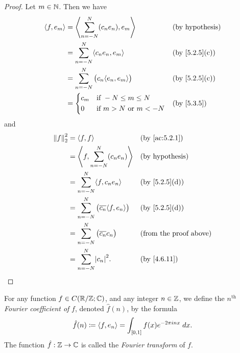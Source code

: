 \begin{proof}
  Let \(m \in \N\).
  Then we have
  \begin{align*}
    \inner*{f, e_m} & = \inner*{\sum_{n = -N}^N (c_n e_n), e_m}         &  & \text{(by hypothesis)}      \\
                    & = \sum_{n = -N}^N \inner*{c_n e_n, e_m}           &  & \text{(by \cref{5.2.5}(c))} \\
                    & = \sum_{n = -N}^N \big(c_n \inner*{e_n, e_m}\big) &  & \text{(by \cref{5.2.5}(c))} \\
                    & = \begin{dcases}
                          c_m & \text{if } -N \leq m \leq N         \\
                          0   & \text{if } m > N \text{ or } m < -N
                        \end{dcases}      &  & \text{(by \cref{5.3.5})}
  \end{align*}
  and
  \begin{align*}
    \norm*{f}_2^2 & = \inner*{f, f}                                            &  & \text{(by \cref{ac:5.2.1})}   \\
                  & = \inner*{f, \sum_{n = -N}^N (c_n e_n)}                    &  & \text{(by hypothesis)}        \\
                  & = \sum_{n = -N}^N \inner*{f, c_n e_n}                      &  & \text{(by \cref{5.2.5}(d))}   \\
                  & = \sum_{n = -N}^N \big(\overline{c_n} \inner*{f, e_n}\big) &  & \text{(by \cref{5.2.5}(d))}   \\
                  & = \sum_{n = -N}^N \big(\overline{c_n} c_n\big)             &  & \text{(from the proof above)} \\
                  & = \sum_{n = -N}^N \abs{c_n}^2.                             &  & \text{(by \cref{4.6.11})}
  \end{align*}
\end{proof}

\begin{defn}\label{5.3.7}
  For any function \(f \in C(\R / \Z ; \C)\), and any integer \(n \in \Z\), we define the \(n^{\text{th}}\) \emph{Fourier coefficient of} \(f\), denoted \(\hat{f}(n)\), by the formula
  \[
    \hat{f}(n) \coloneqq \inner*{f, e_n} = \int_{[0, 1]} f(x) e^{- 2 \pi i n x} \; dx.
  \]
  The function \(\hat{f} : \Z \to \C\) is called the \emph{Fourier transform} of \(f\).
\end{defn}

